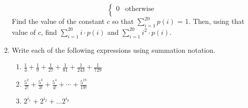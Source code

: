 \documentclass{article}
\begin{document}
\begin{enumerate}
$$\begin{cases}
                        0 & \text{otherwise} \\
                        \end{cases}
                        $$
                        Find the value of the constant $c$ so that $ \sum_{i=1}^{20} p(i)$ = 1. Then, using that value of $c$, find $ \sum_{i=1}^{20} i\cdot p(i)$ and $ \sum_{i=1}^{20} i^2 \cdot p(i)$. 
                    \item Write each of the following expressions using summation notation.
                        \begin{enumerate}
                            \item $ \frac{1}{3}+\frac{1}{9}+\frac{1}{27}+\frac{1}{81} + \frac{1}{243}+ \frac{1}{729}$
                            \item $ \frac{5^2}{2!}+\frac{5^3}{3!}+\frac{5^4}{4!} + \cdots + \frac{5^{19}}{19!}$
                            \item $2^{i_1} + 2^{i_2} + \ldots 2^{i_k}$
                        \end{enumerate}
                \end{enumerate}
                
\end{document}

